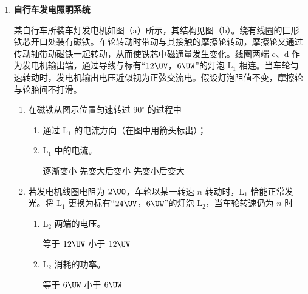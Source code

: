 \documentclass[\gkver]{gaokaozhenti}
\begin{document}
\begin{enumerate}
{（2）带电粒子在匀强磁场中运动周期 $T = \frac{2\pi m}{qB} \propto \frac{m}{q}$，因此 $\ce{^{1}_{1}H}$ 与 $\ce{^{3}_{1}H}$ 的运动周期之比为 1:3，$\ce{^{1}_{1}H}$ 完成 3 次加速时，$\ce{^{3}_{1}H}$ 只经历了 1 次加速。由动能定理 $qU = \Delta E_{k}$ 可得两个粒子的动能之比为 1:3。正确选项为 E。
}

\item
\textbf{自行车发电照明系统}

某自行车所装车灯发电机如图（a）所示，其结构见图（b）。绕有线圈的匚形铁芯开口处装有磁铁。车轮转动时带动与其接触的摩擦轮转动，摩擦轮又通过传动轴带动磁铁一起转动，从而使铁芯中磁通量发生变化。线圈两端 c、d 作为发电机输出端，通过导线与标有“$12 \UV$，$6 \UW$”的灯泡 L$_{1}$ 相连。当车轮匀速转动时，发电机输出电压近似视为正弦交流电。假设灯泡阻值不变，摩擦轮与轮胎间不打滑。



\begin{enumerate}
	\item
	在磁铁从图示位置匀速转过 $90^\circ$ 的过程中
	\begin{enumerate}
		\item
		通过 L$_{1}$ 的电流方向（在图中用箭头标出）；

		\item
		L$_{1}$ 中的电流。

		{逐渐变小}
		{先变大后变小}
		{先变小后变大}
	\end{enumerate}

	\item
	若发电机线圈电阻为 $2 \UO$，车轮以某一转速 $n$ 转动时，L$_{1}$ 恰能正常发光。将 L$_{1}$ 更换为标有“$24 \UV$，$6 \UW$”的灯泡 L$_{2}$，当车轮转速仍为 $n$ 时
	\begin{enumerate}
		\item
		L$_{2}$ 两端的电压。

		{等于 $12 \UV$}
		{小于 $12 \UV$}

		\item
		L$_{2}$ 消耗的功率。

		{等于 $6 \UW$}
		{小于 $6 \UW$}
	\end{enumerate}


\end{enumerate}
\end{enumerate}
\end{document}

